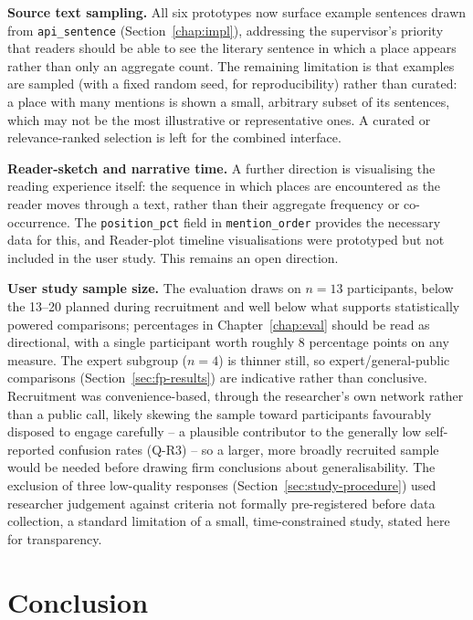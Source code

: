 \documentclass[logo,msc]{infthesis}
\begin{document}
\textbf{Source text sampling.} All six prototypes now surface example sentences drawn from \texttt{api\_sentence} (Section~\ref{chap:impl}), addressing the supervisor's priority that readers should be able to see the literary sentence in which a place appears rather than only an aggregate count. The remaining limitation is that examples are sampled (with a fixed random seed, for reproducibility) rather than curated: a place with many mentions is shown a small, arbitrary subset of its sentences, which may not be the most illustrative or representative ones. A curated or relevance-ranked selection is left for the combined interface.
 
\textbf{Reader-sketch and narrative time.} A further direction is visualising the reading experience itself: the sequence in which places are encountered as the reader moves through a text, rather than their aggregate frequency or co-occurrence. The \texttt{position\_pct} field in \texttt{mention\_order} provides the necessary data for this, and Reader-plot timeline visualisations were prototyped but not included in the user study. This remains an open direction.

\textbf{User study sample size.} The evaluation draws on $n=13$ participants, below the 13--20 planned during recruitment and well below what supports statistically powered comparisons; percentages in Chapter~\ref{chap:eval} should be read as directional, with a single participant worth roughly 8 percentage points on any measure. The expert subgroup ($n=4$) is thinner still, so expert/general-public comparisons (Section~\ref{sec:fp-results}) are indicative rather than conclusive. Recruitment was convenience-based, through the researcher's own network rather than a public call, likely skewing the sample toward participants favourably disposed to engage carefully -- a plausible contributor to the generally low self-reported confusion rates (Q-R3) -- so a larger, more broadly recruited sample would be needed before drawing firm conclusions about generalisability. The exclusion of three low-quality responses (Section~\ref{sec:study-procedure}) used researcher judgement against criteria not formally pre-registered before data collection, a standard limitation of a small, time-constrained study, stated here for transparency.
 
 
\chapter{Conclusion}
\label{chap:conclusion}
 
\end{document}
